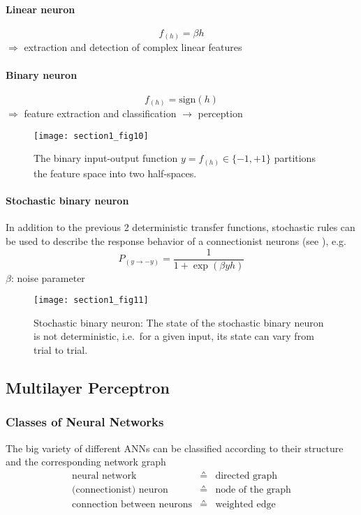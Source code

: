 \paragraph{Linear neuron}
\begin{equation} 
	f_{(h)} = \beta h
\end{equation}
$\Rightarrow$ extraction and detection of complex linear features
\paragraph{Binary neuron}
\begin{equation} 
	f_{(h)} = \mathrm{sign} (h)
\end{equation}
$\Rightarrow$ feature extraction and classification $\rightarrow$ perception
\begin{figure}[h]
  \centering
	\texttt{[image: section1\_fig10]}   
  \caption{The binary input-output function $y = f_{(h)} \in \{-1,+1\}$ 
partitions the feature space into two half-spaces.}
\end{figure}
\paragraph{Stochastic binary neuron}
In addition to the previous 2 deterministic transfer functions, stochastic
rules can be used to describe the response behavior of a
connectionist neurons (see \cite[ch.~39.1]{MacKay2003}), e.g.
\begin{equation}
	P_{(y \rightarrow -y)} = \frac{1}{1 + \exp (\beta y h)}
\end{equation}
$\beta$: noise parameter
\begin{figure}[h]
  \centering
\texttt{[image: section1\_fig11]}  
\caption{Stochastic binary neuron: The state of the stochastic binary neuron is not
deterministic, i.e.\ for a given input, its state can vary from trial
to trial.}
\end{figure}


\subsection{Multilayer Perceptron}


\subsubsection{Classes of Neural Networks}
The big variety of different ANNs can be classified according to their structure
 and the corresponding network graph
\[ \begin{array} {rcl}
\text{neural network} & \corresponds & \text{directed graph} \\
\text{(connectionist) neuron} & \corresponds & \text{node of the graph} \\
\text{connection between neurons} & \corresponds & \text{weighted edge} \\\\
\end{array} \]


